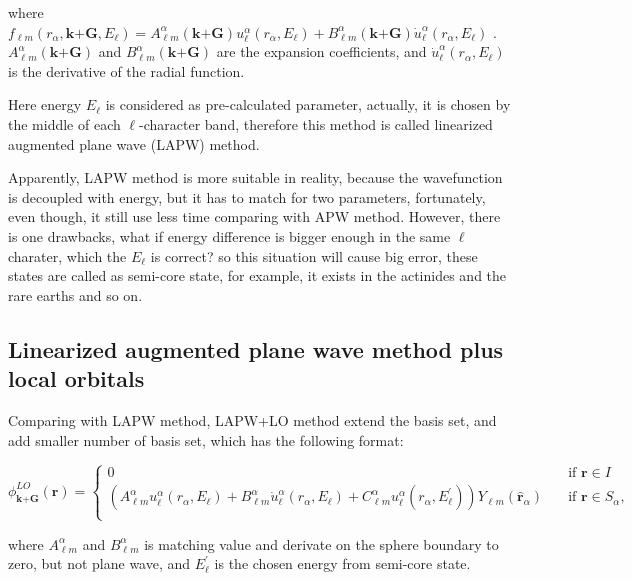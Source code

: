 \documentclass[a4paper, 12pt, titlepage,oneside,drop]{kthesis}
\begin{document}
\noindent where $f_{{\ell}{m}} (r_{\alpha},\textbf{k+G} ,E_{\ell}) =  A _{{\ell}m}^{\alpha} (\textbf {k+G}) u_{{\ell}}^{\alpha}(r_{\alpha}, E_{\ell}) + B _{{\ell}m}^{\alpha} (\textbf {k+G}) \dot{u}_{{\ell}}^{\alpha}(r_{\alpha}, E_{\ell})$
. $A _{{\ell}m}^{\alpha} (\textbf {k+G})$ and $B _{{\ell}m}^{\alpha} (\textbf {k+G})$ are the expansion coefficients, and $\dot{u}_{{\ell}}^{\alpha}(r_{\alpha}, E_{\ell} )$ is the derivative of the radial function.

\noindent Here energy $E_{\ell}$  is considered as pre-calculated parameter, actually, it is chosen by the middle of  each $\ell$-character band, therefore this method is called linearized augmented plane wave (LAPW) method.

\noindent Apparently, LAPW method is more suitable in reality, because the wavefunction is decoupled with energy, but it has to match for two parameters,
fortunately, even though, it still use less time comparing with APW method. However, there is one drawbacks, what if energy difference is bigger enough in the same $ {\ell} $ charater, 
which the $E_{\ell}$ is correct? so this situation will cause big error, these states are called as semi-core state, for example, it exists in the actinides and the rare earths and so on.

\subsection{Linearized augmented plane wave method plus local orbitals}
Comparing with LAPW method, LAPW+LO method extend the basis set, and add smaller number of basis set, which has the following format:


\begin{equation}\label{lap5}
\phi^{LO}_\textbf{k+G} (\textbf{r})= 
\begin{cases} 0 & \quad \mbox{if $\textbf{r} \in I $}
\\
(A _{{\ell}m}^{\alpha}  u_{{\ell}}^{\alpha}(r_{\alpha}, E_{\ell}) + B _{{\ell}m}^{\alpha}  \dot{u}_{{\ell}}^{\alpha}(r_{\alpha}, E_{\ell}) + C _{{\ell}m}^{\alpha}  u_{{\ell}}^{\alpha}(r_{\alpha}, E^{\prime}_{\ell})){Y_{{\ell}m}(\hat{\textbf{r}}_{\alpha})} & \quad \mbox{if $\textbf{r} \in S_\alpha, $}\\ 
\end{cases}
\end{equation}
 
\noindent where $A _{{\ell}m}^{\alpha}$ and $B _{{\ell}m}^{\alpha}$ is matching value and derivate on the sphere boundary to zero, but not plane wave, and $E^{\prime}_{\ell}$ is
the chosen energy from semi-core state.
\end{document}
